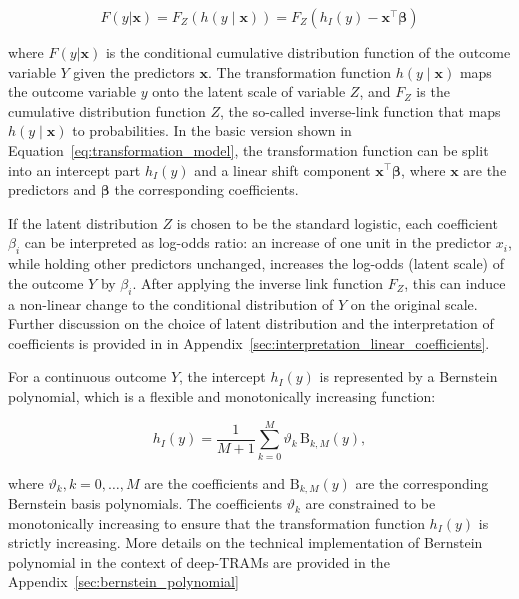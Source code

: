 \begin{equation}
F(y|\mathbf{x}) = F_Z(h(y \mid \mathbf{x})) =  F_Z(h_I(y) - \mathbf{x}^\top \boldsymbol{\beta})
\label{eq:transformation_model}
\end{equation}

where $F(y|\mathbf{x})$ is the conditional cumulative distribution function of the outcome variable $Y$ given the predictors $\mathbf{x}$. The transformation function $h(y \mid \mathbf{x})$ maps the outcome variable $y$ onto the latent scale of variable $Z$, and $F_Z$ is the cumulative distribution function $Z$, the so-called inverse-link function that maps $h(y \mid \mathbf{x})$ to probabilities. In the basic version shown in Equation~\ref{eq:transformation_model}, the transformation function can be split into an intercept part $h_I(y)$ and a linear shift component $\mathbf{x}^\top \boldsymbol{\beta}$, where $\mathbf{x}$ are the predictors and $\boldsymbol{\beta}$ the corresponding coefficients.

If the latent distribution $Z$ is chosen to be the standard logistic, each coefficient $\beta_i$ can be interpreted as log-odds ratio: an increase of one unit in the predictor $x_i$, while holding other predictors unchanged, increases the log-odds (latent scale) of the outcome $Y$ by $\beta_i$. After applying the inverse link function $F_Z$, this can induce a non-linear change to the conditional distribution of $Y$ on the original scale. Further discussion on the choice of latent distribution and the interpretation of coefficients is provided in in Appendix~\ref{sec:interpretation_linear_coefficients}.

For a continuous outcome $Y$, the intercept $h_I(y)$ is represented by a Bernstein polynomial, which is a flexible and monotonically increasing function:

\begin{equation}
h_I(y) = \frac{1}{M + 1} \sum_{k=0}^{M} \vartheta_k \, \text{B}_{k, M}(y),
\label{eq:methods_bernstein_polynomial}
\end{equation}

where $\vartheta_k, k = 0, \ldots, M$ are the coefficients and $\text{B}_{k, M}(y)$ are the corresponding Bernstein basis polynomials. The coefficients $\vartheta_k$ are constrained to be monotonically increasing to ensure that the transformation function $h_I(y)$ is strictly increasing. More details on the technical implementation of Bernstein polynomial in the context of deep-TRAMs are provided in the Appendix~\ref{sec:bernstein_polynomial}






